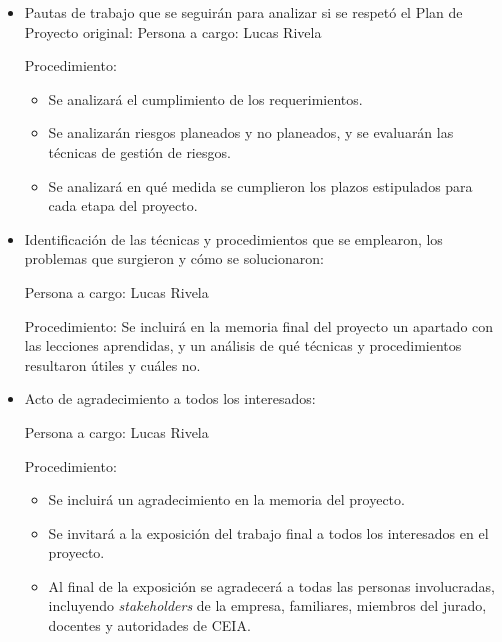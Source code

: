 \documentclass[
11pt, %
]{charter}
\begin{document}
\begin{itemize}
	\item Pautas de trabajo que se seguirán para analizar si se respetó el Plan de Proyecto original:
	Persona a cargo: Lucas Rivela
	
	Procedimiento:
	\begin{itemize}
		\item Se analizará el cumplimiento de los requerimientos.
		\item Se analizarán riesgos planeados y no planeados, y se evaluarán las técnicas de gestión de riesgos.
		\item Se analizará en qué medida se cumplieron los plazos estipulados para cada etapa del proyecto.
	\end{itemize}
	
	\item Identificación de las técnicas y procedimientos que se emplearon, los problemas que surgieron y cómo se solucionaron:
	
	Persona a cargo: Lucas Rivela
	
	Procedimiento: Se incluirá en la memoria final del proyecto un apartado con las lecciones aprendidas, y un análisis de qué técnicas y procedimientos resultaron útiles y cuáles no.
	
	\item Acto de agradecimiento a todos los interesados:
	
	Persona a cargo: Lucas Rivela
	
	Procedimiento: 
	\begin{itemize}
		\item Se incluirá un agradecimiento en la memoria del proyecto.
		\item Se invitará a la exposición del trabajo final a todos los interesados en el proyecto.
		\item Al final de la exposición se agradecerá a todas las personas involucradas, incluyendo \textit{stakeholders} de la empresa, familiares, miembros del jurado, docentes y autoridades de CEIA.
	\end{itemize}		
	
\end{itemize}

\end{document}
